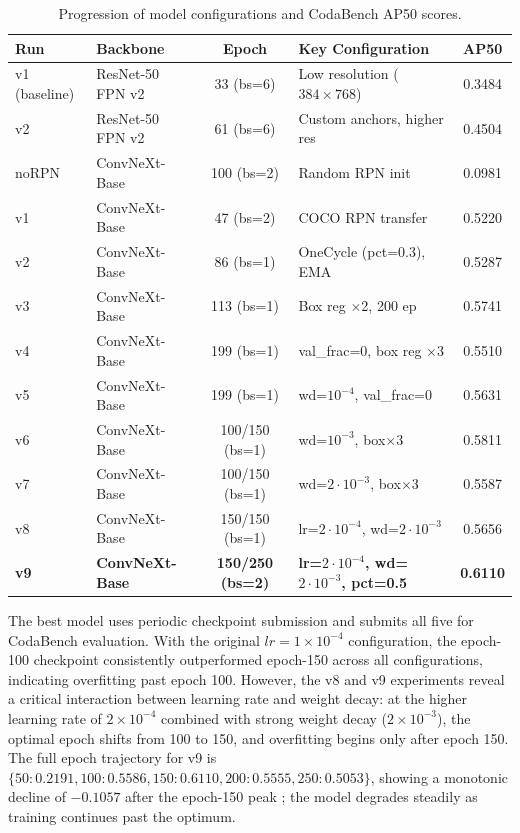 \documentclass[12pt, a4paper]{article}
\begin{document}
\begin{table}[htbp]
\centering
\caption{Progression of model configurations and CodaBench AP50 scores.}
\label{tab:results}
\small
\setlength{\tabcolsep}{4pt}
\begin{tabular}{@{}llc>{\raggedright\arraybackslash}p{4.2cm}c@{}}
\toprule
\textbf{Run} & \textbf{Backbone} & \textbf{Epoch} & \textbf{Key Configuration} & \textbf{AP50} \\ \midrule
v1 (baseline) & ResNet-50 FPN v2 & 33 (bs=6) & Low resolution ($384\times 768$) & 0.3484 \\
v2 & ResNet-50 FPN v2 & 61 (bs=6) & Custom anchors, higher res & 0.4504 \\
noRPN & ConvNeXt-Base & 100 (bs=2) & Random RPN init & 0.0981 \\
v1 & ConvNeXt-Base & 47 (bs=2) & COCO RPN transfer & 0.5220 \\
v2 & ConvNeXt-Base & 86 (bs=1) & OneCycle (pct=0.3), EMA & 0.5287 \\
v3 & ConvNeXt-Base & 113 (bs=1) & Box reg $\times$2, 200 ep & 0.5741 \\
v4 & ConvNeXt-Base & 199 (bs=1) & val\_frac=0, box reg $\times$3 & 0.5510 \\
v5 & ConvNeXt-Base & 199 (bs=1) & wd=$10^{-4}$, val\_frac=0 & 0.5631 \\
v6 & ConvNeXt-Base & 100/150 (bs=1) & wd=$10^{-3}$, box$\times$3 & 0.5811 \\
v7 & ConvNeXt-Base & 100/150 (bs=1) & wd=$2\cdot 10^{-3}$, box$\times$3 & 0.5587 \\
v8 & ConvNeXt-Base & 150/150 (bs=1) & lr=$2\cdot 10^{-4}$, wd=$2\cdot 10^{-3}$ & 0.5656 \\
\textbf{v9} & \textbf{ConvNeXt-Base} & \textbf{150/250 (bs=2)} & \textbf{lr=$2\cdot 10^{-4}$, wd=$2\cdot 10^{-3}$, pct=0.5} & \textbf{0.6110} \\ \bottomrule
\end{tabular}
\end{table}

The best model uses periodic checkpoint submission and submits all five for CodaBench evaluation. With the original $lr=1 \times 10^{-4}$ configuration, the epoch-100 checkpoint consistently outperformed epoch-150 across all configurations, indicating overfitting past epoch 100. However, the v8 and v9 experiments reveal a critical interaction between learning rate and weight decay: at the higher learning rate of $2 \times 10^{-4}$ combined with strong weight decay ($2 \times 10^{-3}$), the optimal epoch shifts from 100 to 150, and overfitting begins only after epoch 150. The full epoch trajectory for v9 is $\{50: 0.2191, 100: 0.5586, 150: \mathbf{0.6110}, 200: 0.5555, 250: 0.5053\}$, showing a monotonic decline of $-0.1057$ after the epoch-150 peak ; the model degrades steadily as training continues past the optimum.
\end{document}
